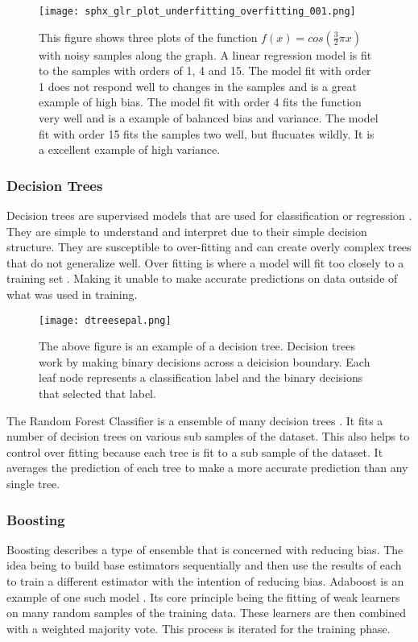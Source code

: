 \begin{figure}[h]
    \centering
    \texttt{[image: sphx\_glr\_plot\_underfitting\_overfitting\_001.png]}
    \caption{This figure shows three plots of the function \( f(x) = cos(\frac{3}{2} \pi x)\) with noisy samples along the graph. 
    A linear regression model is fit to the samples with orders of 1, 4 and 15.
    The model fit with order 1 does not respond well to changes in the samples and is a great example of high bias.
    The model fit with order 4 fits the function very well and is a example of balanced bias and variance.
    The model fit with order 15 fits the samples two well, but flucuates wildly. 
    It is a excellent example of high variance.}
    \label{}
\end{figure}

\subsubsection{Decision Trees}
Decision trees are supervised models that are used for classification or regression \cite{breiman2017classification}.
They are simple to understand and interpret due to their simple decision structure. 
They are susceptible to over-fitting and can create overly complex trees that do not generalize well.
Over fitting is where a model will fit too closely to a training set \cite{cawley2010over}. 
Making it unable to make accurate predictions on data outside of what was used in training.

\begin{figure}[h]
    \centering
    \texttt{[image: dtreesepal.png]}
    \caption{The above figure is an example of a decision tree. Decision trees work by making binary decisions across a deicision boundary.
    Each leaf node represents a classification label and the binary decisions that selected that label.}
    \label{}
\end{figure}

\par
The Random Forest Classifier is a ensemble of many decision trees \cite{breiman2001random}.
It fits a number of decision trees on various sub samples of the dataset.
This also helps to control over fitting because each tree is fit to a sub sample of the dataset.
It averages the prediction of each tree to make a more accurate prediction than any single tree.


\subsubsection{Boosting}
Boosting describes a type of ensemble that is concerned with reducing bias.
The idea being to build base estimators sequentially and then use the results of each to train a different estimator with the intention of reducing bias.
Adaboost is an example of one such model \cite{freund1995desicion}.
Its core principle being the fitting of weak learners on many random samples of the training data.
These learners are then combined with a weighted majority vote. 
This process is iterated for the training phase.




